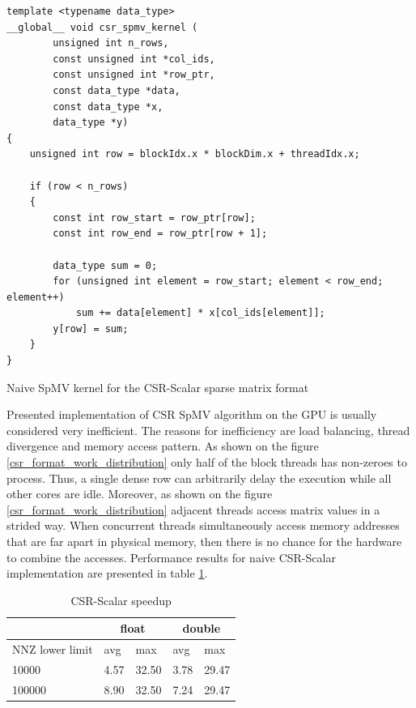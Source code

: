 \documentclass{article}
\begin{document}
\begin{listing}[H]
\begin{verbatim}
template <typename data_type>
__global__ void csr_spmv_kernel (
		unsigned int n_rows,
		const unsigned int *col_ids,
		const unsigned int *row_ptr,
		const data_type *data,
		const data_type *x,
		data_type *y)
{
	unsigned int row = blockIdx.x * blockDim.x + threadIdx.x;

	if (row < n_rows)
	{
		const int row_start = row_ptr[row];
		const int row_end = row_ptr[row + 1];

		data_type sum = 0;
		for (unsigned int element = row_start; element < row_end; element++)
			sum += data[element] * x[col_ids[element]];
		y[row] = sum;
	}
}
\end{verbatim}
\caption{Naive SpMV kernel for the CSR-Scalar sparse matrix format}
\label{csr_scalar}
\end{listing}

Presented implementation of CSR SpMV algorithm on the GPU is usually considered very inefficient. The reasons for
inefficiency are load balancing, thread divergence and memory access pattern. As shown on the figure \ref{csr_format_work_distribution} only half
of the block threads has non-zeroes to process. Thus, a single dense row can arbitrarily delay the execution while all
other cores are idle. Moreover, as shown on the figure \ref{csr_format_work_distribution} adjacent threads access matrix values in a strided way. When concurrent threads simultaneously 
access memory addresses that are far apart in physical memory, then there is no chance for the hardware to combine the accesses. Performance
results for naive CSR-Scalar implementation are presented in table \ref{csr_scalar_speedup_table}. 

\begin{table}[H]
	\centering
	\begin{tabular}{ |p{2.6cm}||p{1cm}|p{1cm}|p{1cm}|p{1cm}|  }
	 \hline
		& \multicolumn{2}{|c|}{float} & \multicolumn{2}{|c|}{double}\\
	 \hline
	 NNZ lower limit & avg & max & avg & max  \\
	 \hline
	 10000  & 4.57 & 32.50 & 3.78 & 29.47 \\
	 100000 & 8.90 & 32.50 & 7.24 & 29.47 \\
	 \hline
	\end{tabular}
	\caption{CSR-Scalar speedup}
  \label{csr_scalar_speedup_table}
\end{table}
\end{document}
